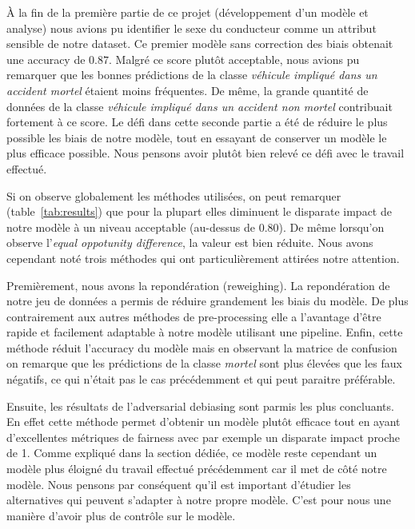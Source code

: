 \documentclass{article}
\begin{document}
    À la fin de la première partie de ce projet (développement d'un modèle et analyse) nous avions pu 
    identifier le sexe du conducteur comme un attribut sensible de notre dataset. Ce premier modèle 
    sans correction des biais obtenait une accuracy de $0.87$. Malgré ce score plutôt acceptable, nous 
    avions pu remarquer que les bonnes prédictions de la classe \textit{véhicule impliqué dans un accident 
    mortel} étaient moins fréquentes.
    De même, la grande quantité de données de la classe \textit{véhicule impliqué dans un accident 
    non mortel} contribuait fortement à ce score. 
    Le défi dans cette seconde partie a été de réduire le plus possible les biais de notre modèle, tout 
    en essayant de conserver un modèle le plus efficace possible. Nous pensons avoir plutôt bien relevé ce 
    défi avec le travail effectué.

    Si on observe globalement les méthodes utilisées, on peut remarquer (table~\ref{tab:results}) que pour la plupart elles 
    diminuent le disparate impact de notre modèle à un niveau acceptable (au-dessus de 0.80). De même lorsqu'on 
    observe l'\textit{equal oppotunity difference}, la valeur est bien réduite. 
    Nous avons cependant noté trois méthodes qui ont particulièrement attirées notre attention.

    Premièrement, nous avons la repondération (reweighing). La repondération de notre jeu de données a 
    permis de réduire grandement les biais du modèle. De plus contrairement aux autres méthodes de 
    pre-processing elle a l'avantage d'être rapide et facilement adaptable à notre modèle utilisant une 
    pipeline. Enfin, cette méthode réduit l'accuracy du modèle mais en observant la matrice de confusion 
    on remarque que les prédictions de la classe \textit{mortel} sont plus élevées que les faux négatifs, 
    ce qui n'était pas le cas précédemment et qui peut paraitre préférable.

    Ensuite, les résultats de l'adversarial debiasing sont parmis les plus concluants. En effet cette 
    méthode permet d'obtenir un modèle plutôt efficace tout en ayant d'excellentes métriques de fairness avec 
    par exemple un disparate impact proche de 1. Comme expliqué dans la section dédiée, ce modèle reste cependant 
    un modèle plus éloigné du travail effectué précédemment car il met de côté notre modèle. Nous pensons par
     conséquent qu'il est important d'étudier les alternatives qui peuvent s'adapter à notre propre modèle.
    C'est pour nous une manière d'avoir plus de contrôle sur le modèle.
\end{document}
